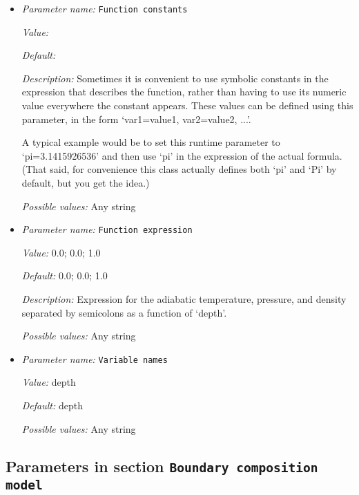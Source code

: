 \begin{itemize}
\item {\it Parameter name:} {\tt Function constants}
\label{parameters:Adiabatic conditions model/Function/Function constants}


{\it Value:} 


{\it Default:} 


{\it Description:} Sometimes it is convenient to use symbolic constants in the expression that describes the function, rather than having to use its numeric value everywhere the constant appears. These values can be defined using this parameter, in the form `var1=value1, var2=value2, ...'.

A typical example would be to set this runtime parameter to `pi=3.1415926536' and then use `pi' in the expression of the actual formula. (That said, for convenience this class actually defines both `pi' and `Pi' by default, but you get the idea.)


{\it Possible values:} Any string
\item {\it Parameter name:} {\tt Function expression}
\label{parameters:Adiabatic conditions model/Function/Function expression}


{\it Value:} 0.0; 0.0; 1.0


{\it Default:} 0.0; 0.0; 1.0


{\it Description:} Expression for the adiabatic temperature, pressure, and density separated by semicolons as a function of `depth'.


{\it Possible values:} Any string
\item {\it Parameter name:} {\tt Variable names}
\label{parameters:Adiabatic conditions model/Function/Variable names}


{\it Value:} depth


{\it Default:} depth


{\it Possible values:} Any string
\end{itemize}

\subsection{Parameters in section \tt Boundary composition model}
\label{parameters:Boundary_20composition_20model}

